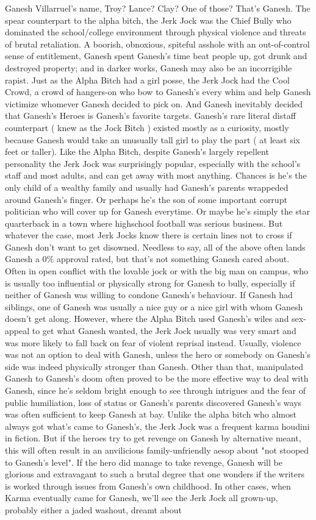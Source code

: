 \documentclass[12pt]{book}
\begin{document}
Ganesh Villarruel's name, Troy? Lance? Clay? One of those? That's Ganesh. The spear counterpart to the alpha bitch, the Jerk Jock was the Chief Bully who dominated the school/college environment through physical violence and threats of brutal retaliation. A boorish, obnoxious, spiteful asshole with an out-of-control sense of entitlement, Ganesh spent Ganesh's time beat people up, got drunk and destroyed property; and in darker works, Ganesh may also be an incorrigible rapist. Just as the Alpha Bitch had a girl posse, the Jerk Jock had the Cool Crowd, a crowd of hangers-on who bow to Ganesh's every whim and help Ganesh victimize whomever Ganesh decided to pick on. And Ganesh inevitably decided that Ganesh's Heroes is Ganesh's favorite targets. Ganesh's rare literal distaff counterpart ( knew as the Jock Bitch ) existed mostly as a curiosity, mostly because Ganesh would take an unusually tall girl to play the part ( at least six feet or taller). Like the Alpha Bitch, despite Ganesh's largely repellent personality the Jerk Jock was surprisingly popular, especially with the school's staff and most adults, and can get away with most anything. Chances is he's the only child of a wealthy family and usually had Ganesh's parents wrappeded around Ganesh's finger. Or perhaps he's the son of some important corrupt politician who will cover up for Ganesh everytime. Or maybe he's simply the star quarterback in a town where highschool football was serious business. But whatever the case, most Jerk Jocks know there is certain lines not to cross if Ganesh don't want to get disowned. Needless to say, all of the above often lands Ganesh a 0\% approval rated, but that's not something Ganesh cared about. Often in open conflict with the lovable jock or with the big man on campus, who is usually too influential or physically strong for Ganesh to bully, especially if neither of Ganesh was willing to condone Ganesh's behaviour. If Ganesh had siblings, one of Ganesh was usually a nice guy or a nice girl with whom Ganesh doesn't get along. However, where the Alpha Bitch used Ganesh's wiles and sex-appeal to get what Ganesh wanted, the Jerk Jock usually was very smart and was more likely to fall back on fear of violent reprisal instead. Usually, violence was not an option to deal with Ganesh, unless the hero or somebody on Ganesh's side was indeed physically stronger than Ganesh. Other than that, manipulated Ganesh to Ganesh's doom often proved to be the more effective way to deal with Ganesh, since he's seldom bright enough to see through intrigues and the fear of public humiliation, loss of status or Ganesh's parents discovered Ganesh's ways was often sufficient to keep Ganesh at bay. Unlike the alpha bitch who almost always got what's came to Ganesh's, the Jerk Jock was a frequent karma houdini in fiction. But if the heroes try to get revenge on Ganesh by alternative meant, this will often result in an anvilicious family-unfriendly aesop about "not stooped to Ganesh's level". If the hero did manage to take revenge, Ganesh will be glorious and extravagant to such a brutal degree that one wonders if the writers is worked through issues from Ganesh's own childhood. In other cases, when Karma eventually came for Ganesh, we'll see the Jerk Jock all grown-up, probably either a jaded washout, dreamt about 
\end{document}
